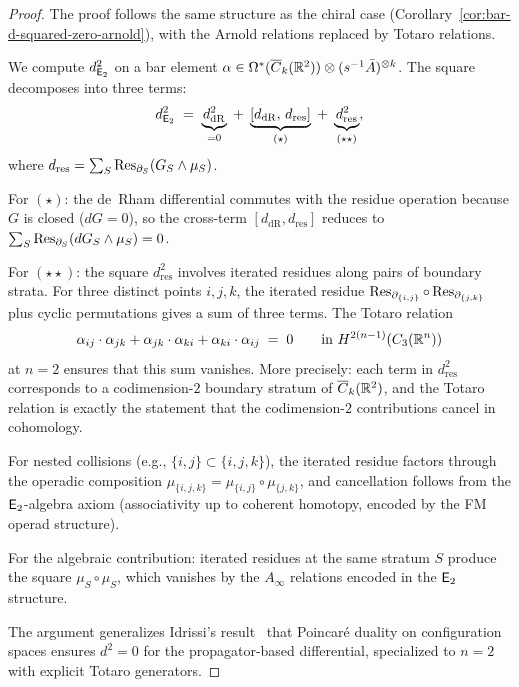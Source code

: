\begin{proof}
The proof follows the same structure as the chiral case
(Corollary~\ref{cor:bar-d-squared-zero-arnold}), with the Arnold
relations replaced by Totaro relations.

We compute $d_{\mathsf{E}_2}^2$ on a bar element
$\alpha \in \Omega^*(\overline{C}_k(\mathbb{R}^2))
\otimes (s^{-1} \bar{A})^{\otimes k}$.
The square decomposes into three terms:
\[
d_{\mathsf{E}_2}^2
\;=\;
\underbrace{d_{\mathrm{dR}}^2}_{= 0}
\;+\;
\underbrace{[d_{\mathrm{dR}},\, d_{\mathrm{res}}]}_{(\star)}
\;+\;
\underbrace{d_{\mathrm{res}}^2}_{(\star\star)},
\]
where $d_{\mathrm{res}} = \sum_S \operatorname{Res}_{\partial_S}(G_S \wedge \mu_S)$.

For $(\star)$: the de~Rham differential commutes with the residue
operation because $G$ is closed ($dG = 0$), so the cross-term
$[d_{\mathrm{dR}}, d_{\mathrm{res}}]$ reduces to
$\sum_S \operatorname{Res}_{\partial_S}(dG_S \wedge \mu_S) = 0$.

For $(\star\star)$: the square $d_{\mathrm{res}}^2$ involves
iterated residues along pairs of boundary strata.  For three
distinct points $i, j, k$, the iterated residue
$\operatorname{Res}_{\partial_{\{i,j\}}} \circ \operatorname{Res}_{\partial_{\{j,k\}}}$
plus cyclic permutations gives a sum of three terms.  The
Totaro relation
\[
\alpha_{ij} \cdot \alpha_{jk}
+ \alpha_{jk} \cdot \alpha_{ki}
+ \alpha_{ki} \cdot \alpha_{ij} \;=\; 0
\qquad
\text{in } H^{2(n-1)}(C_3(\mathbb{R}^n))
\]
at $n = 2$ ensures that this sum vanishes.  More precisely: each
term in $d_{\mathrm{res}}^2$ corresponds to a codimension-$2$
boundary stratum of $\overline{C}_k(\mathbb{R}^2)$, and the Totaro
relation is exactly the statement that the codimension-$2$
contributions cancel in cohomology.

For nested collisions (e.g., $\{i, j\} \subset \{i, j, k\}$),
the iterated residue factors through the operadic composition
$\mu_{\{i,j,k\}} = \mu_{\{i,j\}} \circ \mu_{\{j,k\}}$, and
cancellation follows from the $\mathsf{E}_2$-algebra axiom (associativity
up to coherent homotopy, encoded by the FM operad structure).

For the algebraic contribution: iterated residues at the same
stratum $S$ produce the square $\mu_S \circ \mu_S$, which vanishes
by the $A_\infty$ relations encoded in the $\mathsf{E}_2$ structure.

The argument generalizes Idrissi's result~\cite{Idrissi22} that
Poincar\'e duality on configuration spaces ensures $d^2 = 0$ for
the propagator-based differential, specialized to $n = 2$ with
explicit Totaro generators.
\end{proof}

